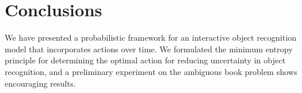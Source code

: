 \section{Conclusions}

We have presented a probabilistic framework for an interactive object recognition model that incorporates actions over time.  We formulated the minimum entropy principle for determining the optimal action for reducing uncertainty in object recognition, and a preliminary experiment on the ambiguous book problem shows encouraging results.


   